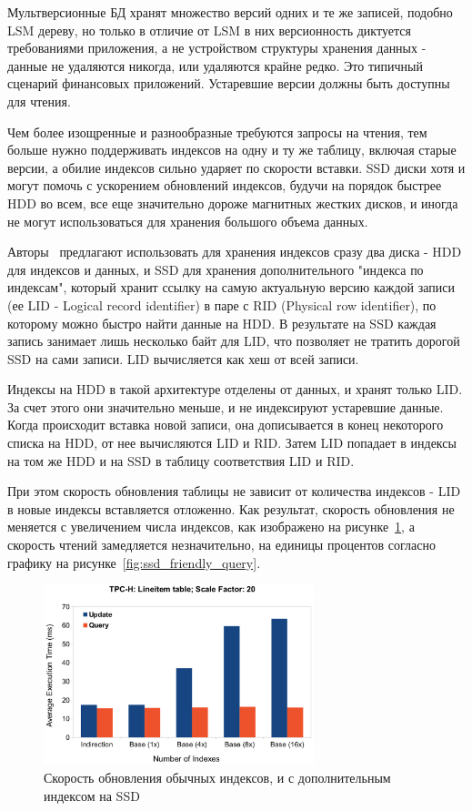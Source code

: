 \documentclass[a4paper,hidelinks,12pt]{article}
\begin{document}
Мультверсионные БД хранят множество версий одних и те же записей, подобно LSM
дереву, но только в отличие от LSM в них версионность диктуется требованиями
приложения, а не устройством структуры хранения данных - данные не удаляются
никогда, или удаляются крайне редко. Это типичный сценарий финансовых
приложений. Устаревшие версии должны быть доступны для чтения.

Чем более изощренные и разнообразные требуются запросы на чтения, тем больше
нужно поддерживать индексов на одну и ту же таблицу, включая старые версии, а
обилие индексов сильно ударяет по скорости вставки. SSD диски хотя и могут
помочь с ускорением обновлений индексов, будучи на порядок быстрее HDD во всем,
все еще значительно дороже магнитных жестких дисков, и иногда не могут
использоваться для хранения большого объема данных.

Авторы~\cite{ssd_friendly} предлагают использовать для хранения индексов сразу
два диска - HDD для индексов и данных, и SSD для хранения дополнительного
"индекса по индексам", который хранит ссылку на самую актуальную версию каждой
записи (ее LID - Logical record identifier) в паре с RID (Physical row
identifier), по которому можно быстро найти данные на HDD. В результате на SSD
каждая запись занимает лишь несколько байт для LID, что позволяет не тратить
дорогой SSD на сами записи. LID вычисляется как хеш от всей записи.

Индексы на HDD в такой архитектуре отделены от данных, и хранят только LID. За
счет этого они значительно меньше, и не индексируют устаревшие данные. Когда
происходит вставка новой записи, она дописывается в конец некоторого списка на
HDD, от нее вычисляются LID и RID. Затем LID попадает в индексы на том же HDD и
на SSD в таблицу соответствия LID и RID.

При этом скорость обновления таблицы не зависит от количества индексов - LID в
новые индексы вставляется отложенно. Как результат, скорость обновления не
меняется с увеличением числа индексов, как изображено на
рисунке~\ref{fig:ssd_friendly_update}, а скорость чтений замедляется
незначительно, на единицы процентов согласно графику на
рисунке~\ref{fig:ssd_friendly_query}.

\begin{figure}[h]
\centering
\includegraphics[width=0.7\textwidth]{ssd_friendly_update}
\caption{Скорость обновления обычных индексов, и с дополнительным индексом на
SSD}
\label{fig:ssd_friendly_update}
\end{figure}
\end{document}
